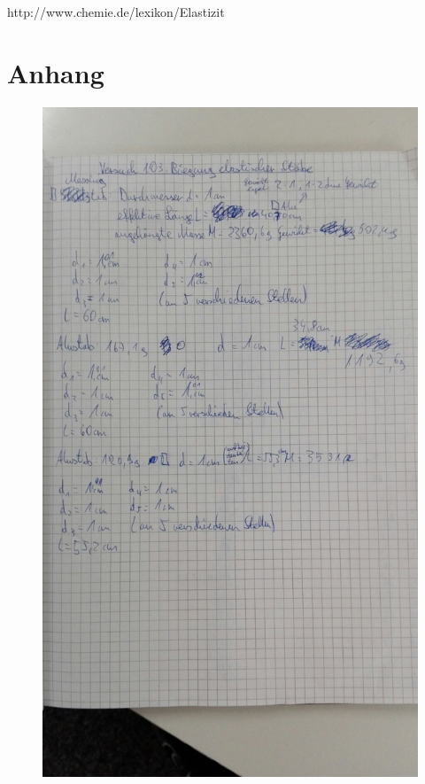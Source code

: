 \documentclass[
  bibliography=totoc,     %
  captions=tableheading,  %
  titlepage=firstiscover, %
]{scrartcl}
\begin{document}
http://www.chemie.de/lexikon/Elastizit%
\section{Anhang}
\begin{figure}[H]
    \centering
    \includegraphics[width=1\textwidth]{V1034.jpeg}
    \label{fig:1034}
\end{figure}\begin{figure}[H]
    \centering

\end{figure}
\end{document}
